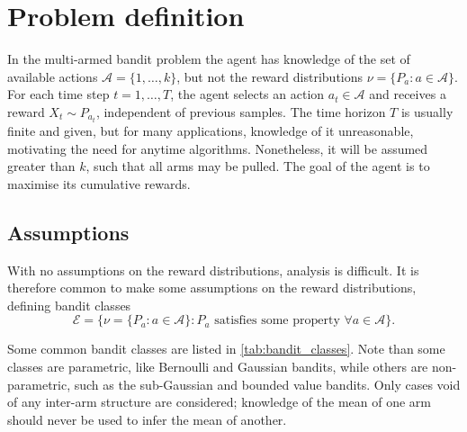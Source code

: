 \section{Problem definition}
In the multi-armed bandit problem the agent has knowledge of the set of available actions $\mathcal{A}=\{1, \dots, k\}$, but not the reward distributions $\nu = \{P_a : a \in \mathcal{A}\}$.
For each time step $t=1, \dots, T$, the agent selects an action $a_t \in \mathcal{A}$ and receives a reward $X_t \sim P_{a_t}$, independent of previous samples.
The time horizon $T$ is usually finite and given, but for many applications, knowledge of it unreasonable, motivating the need for anytime algorithms.
Nonetheless, it will be assumed greater than $k$, such that all arms may be pulled.
The goal of the agent is to maximise its cumulative rewards.

\subsection{Assumptions}
With no assumptions on the reward distributions, analysis is difficult.
It is therefore common to make some assumptions on the reward distributions, defining bandit classes
\begin{equation}
    \mathcal{E} = \{\nu = \{P_a : a \in \mathcal{A}\} : P_a \text{ satisfies some property } \forall a \in \mathcal{A}\}.
\end{equation}

Some common bandit classes are listed in \cref{tab:bandit_classes}.
Note than some classes are parametric, like Bernoulli and Gaussian bandits, while others are non-parametric, such as the sub-Gaussian and bounded value bandits.
Only cases void of any inter-arm structure are considered; knowledge of the mean of one arm should never be used to infer the mean of another.

